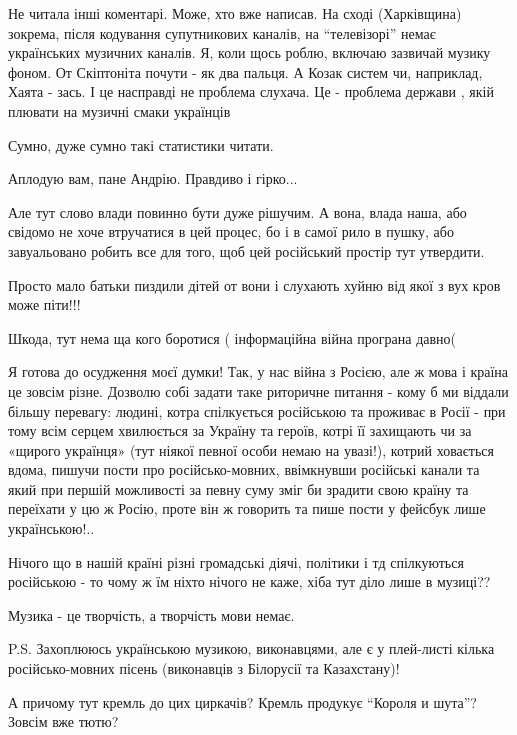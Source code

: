 \begin{itemize}

Не читала інші коментарі. Може, хто вже написав. На сході (Харківщина) зокрема,
після кодування супутникових каналів, на \enquote{телевізорі} немає українських
музичних каналів. Я, коли щось роблю, включаю зазвичай музику фоном. От
Скіптоніта почути - як два пальця. А Козак систем чи, наприклад, Хаята - зась.
І це насправді не проблема слухача. Це - проблема держави , якій плювати на
музичні смаки українців


Сумно, дуже сумно такі статистики читати.


Аплодую вам, пане Андрію. Правдиво і гірко...

Але тут слово влади повинно бути дуже рішучим. А вона, влада наша, або свідомо
не хоче втручатися в цей процес, бо і в самої рило в пушку, або завуальовано
робить все для того, щоб цей російський простір тут утвердити.


Просто мало батьки пиздили дітей от вони і слухають хуйню від якої з вух кров може піти!!!

Шкода, тут нема ща кого боротися ( інформаційна війна програна давно(


Я готова до осудження моєї думки! Так, у нас війна з Росією, але ж мова і
країна це зовсім різне. Дозволю собі задати таке риторичне питання - кому б ми
віддали більшу перевагу: людині, котра спілкується російською та проживає в
Росії - при тому всім серцем хвилюється за Україну та героїв, котрі її
захищають чи за «щирого українця» (тут ніякої певної особи немаю на увазі!),
котрий ховається вдома, пишучи пости про російсько-мовних, ввімкнувши російські
канали та який при першій можливості за певну суму зміг би зрадити свою країну
та переїхати у цю ж Росію, проте він ж говорить та пише пости у фейсбук лише
українською!..

Нічого що в нашій країні різні громадські діячі, політики і тд спілкуються
російською - то чому ж їм ніхто нічого не каже, хіба тут діло лише в музиці??

Музика - це творчість, а творчість мови немає.

P.S. Захоплююсь українською музикою, виконавцями, але є у плей-листі кілька
російсько-мовних пісень (виконавців з Білорусії та Казахстану)!


А причому тут кремль до цих циркачів? Кремль продукує \enquote{Короля и шута}? Зовсім вже тютю?


\end{itemize}

